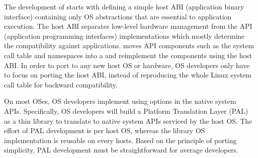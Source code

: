 \label{sec:overview:host}

The development of \graphene{} starts with defining a simple host ABI (application binary interface)
containing only OS abstractions that are essential to application execution.
The host ABI separates
low-level hardware management
from the API (application programming interfaces) implementations which mostly determine the compatibility against applications.
\graphene{} moves API components
such as the system call table
and namespaces into a \libos{} and reimplement the components using the host ABI.
In order to port \graphene{} to any new host OS or hardware,
OS developers only have to focus on
porting the host ABI,
instead of reproducing the whole Linux system call table for backward compatibility.






\label{sec:overview:host:pal}


On most OSes, OS developers
implement \thehostabi{} using options in the native system APIs.
Specifically,
OS developers will build
a Platform Translation Layer (PAL)
as a thin library to translate \hostapis{} to native system APIs
serviced by the host OS.
The effort of PAL development is per host OS, whereas the library OS implementation is reusable on every hosts. %
Based on the principle of porting simplicity, PAL development must be straightforward
for average developers.





